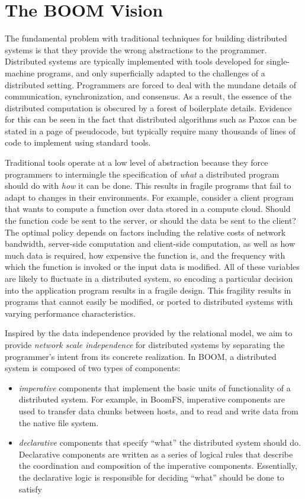 \documentclass{article}
\begin{document}
\section{The BOOM Vision}
The fundamental problem with traditional techniques for building
distributed systems is that they provide the wrong abstractions to the
programmer. Distributed systems are typically implemented with tools
developed for single-machine programs, and only superficially adapted
to the challenges of a distributed setting. Programmers are forced to
deal with the mundane details of communication, synchronization, and
consensus. As a result, the essence of the distributed computation is
obscured by a forest of boilerplate details. Evidence for this can be
seen in the fact that distributed algorithms such as Paxos can be
stated in a page of pseudocode, but typically require many thousands
of lines of code to implement using standard
tools\cite{paxosmadelive}.

Traditional tools operate at a low level of abstraction because they
force programmers to intermingle the specification of \emph{what} a
distributed program should do with \emph{how} it can be done. This
results in fragile programs that fail to adapt to changes in their
environments. For example, consider a client program that wants to
compute a function over data stored in a compute cloud. Should the
function code be sent to the server, or should the data be sent to the
client? The optimal policy depends on factors including the relative
costs of network bandwidth, server-side computation and client-side
computation, as well as how much data is required, how expensive the
function is, and the frequency with which the function is invoked or
the input data is modified. All of these variables are likely to
fluctuate in a distributed system, so encoding a particular decision
into the application program results in a fragile design. This
fragility results in programs that cannot easily be modified, or
ported to distributed systems with varying performance
characteristics.

Inspired by the data independence provided by the relational model, we
aim to provide \emph{network scale independence} for distributed
systems by separating the programmer's intent from its concrete
realization. In BOOM, a distributed system is composed of two types of
components:
\begin{itemize}
\item
  \emph{imperative} components that implement the basic units of
  functionality of a distributed system. For example, in BoomFS,
  imperative components are used to transfer data chunks between
  hosts, and to read and write data from the native file system.

\item
  \emph{declarative} components that specify ``what'' the distributed
  system should do. Declarative components are written as a series of
  logical rules that describe the coordination and composition of the
  imperative components. Essentially, the declarative logic is
  responsible for deciding ``what'' should be done to satisfy 
\end{itemize}
\end{document}
